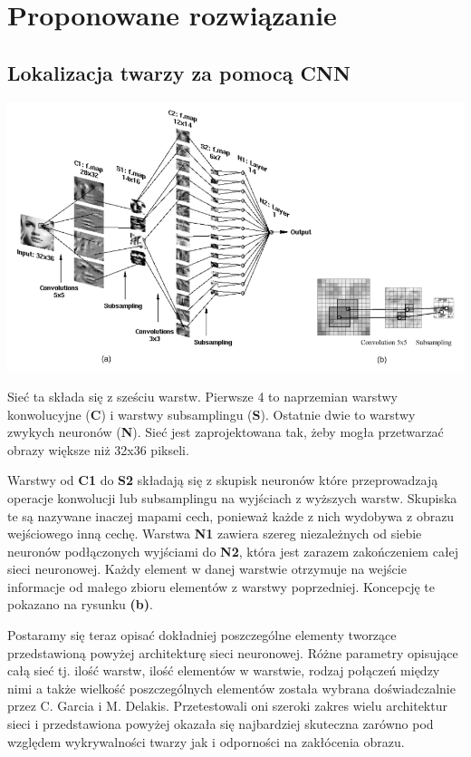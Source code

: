 \documentclass[11pt,a4paper]{article}
\begin{document}
\section{Proponowane rozwiązanie}
\subsection{Lokalizacja twarzy za pomocą CNN}

\vspace*{1cm}
\begin{center}
\includegraphics[scale=0.7]{schemat}
\end{center}
\vspace*{1cm}

Sieć ta składa się z sześciu warstw. Pierwsze 4 to naprzemian warstwy konwolucyjne (\textbf{C}) i 
warstwy subsamplingu (\textbf{S}). Ostatnie dwie to warstwy zwykych neuronów (\textbf{N}). Sieć jest 
zaprojektowana tak, żeby mogła przetwarzać obrazy większe niż 32x36 pikseli.

Warstwy od \textbf {C1} do \textbf{S2} składają się z skupisk neuronów które przeprowadzają operacje
konwolucji lub subsamplingu na wyjściach z wyższych warstw. Skupiska te są nazywane inaczej mapami
cech, ponieważ każde z nich wydobywa z obrazu wejściowego inną cechę. Warstwa  \textbf{N1} zawiera 
szereg niezależnych od siebie neuronów podłączonych wyjściami do \textbf{N2}, która jest zarazem
zakończeniem całej sieci neuronowej. Każdy element w danej warstwie otrzymuje na wejście informacje 
od małego zbioru elementów z warstwy poprzedniej. Koncepcję te pokazano na rysunku  \textbf{(b)}.

Postaramy się teraz opisać dokładniej poszczególne elementy tworzące  przedstawioną powyżej
architekturę sieci neuronowej. Różne parametry opisujące całą sieć tj. ilość warstw, ilość elementów
w warstwie, rodzaj połączeń między nimi a także wielkość poszczególnych elementów została wybrana 
doświadczalnie przez C. Garcia i  M. Delakis. Przetestowali oni szeroki zakres wielu architektur 
sieci i przedstawiona powyżej okazała się najbardziej skuteczna zarówno pod względem wykrywalności 
twarzy jak i odporności na zakłócenia obrazu.
 
\end{document}
